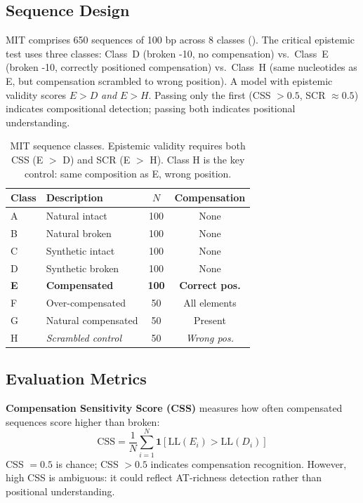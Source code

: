 \documentclass{article}
\newcommand{\css}{\text{CSS}}
\newcommand{\LL}{\text{LL}}
\begin{document}
\subsection{Sequence Design}

MIT comprises 650 sequences of 100 bp across 8 classes
().
The critical epistemic test uses three classes: Class~D (broken -10, no
compensation) vs.\ Class~E (broken -10, correctly positioned compensation)
vs.\ Class~H (same nucleotides as E, but compensation scrambled to wrong
position).
A model with epistemic validity scores $E > D$ \emph{and} $E > H$.
Passing only the first (CSS $> 0.5$, SCR $\approx 0.5$) indicates
compositional detection; passing both indicates positional understanding.

\begin{table}[t]
\caption{MIT sequence classes. Epistemic validity requires both CSS
         (E $>$ D) and SCR (E $>$ H). Class H is the key control:
         same composition as E, wrong position.}
\label{tab:classes}
\vskip 0.05in
\centering
\small
\begin{tabular}{@{}llcc@{}}
\toprule
Class & Description & $N$ & Compensation \\
\midrule
A & Natural intact        & 100 & None \\
B & Natural broken        & 100 & None \\
C & Synthetic intact      & 100 & None \\
D & Synthetic broken      & 100 & None \\
\textbf{E} & \textbf{Compensated} & \textbf{100} & \textbf{Correct pos.} \\
F & Over-compensated      &  50 & All elements \\
G & Natural compensated   &  50 & Present \\
H & \textit{Scrambled control} & 50 & \textit{Wrong pos.} \\
\bottomrule
\end{tabular}
\vskip -0.05in
\end{table}

\subsection{Evaluation Metrics}
\label{sec:metrics}

\textbf{Compensation Sensitivity Score (CSS)} measures how often
compensated sequences score higher than broken:
\begin{equation}
\css = \frac{1}{N} \sum_{i=1}^{N} \mathbf{1}[\LL(E_i) > \LL(D_i)]
\label{eq:css}
\end{equation}
CSS $= 0.5$ is chance; CSS $> 0.5$ indicates compensation recognition.
However, high CSS is ambiguous: it could reflect AT-richness detection
rather than positional understanding.
\end{document}
